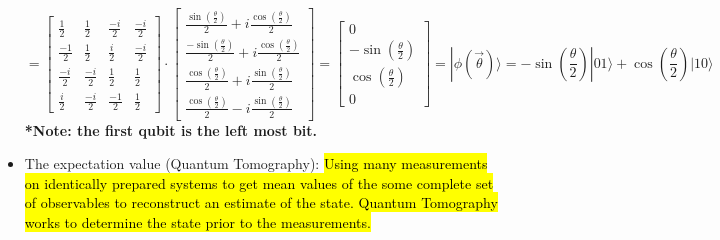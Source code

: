 \documentclass{article}
\begin{document}
\begin{itemize}
	      \begin{equation}
		      \label{eq:1}
		      =
		      \begin{bmatrix}
			      \frac{1}{2}  & \frac{1}{2}  & \frac{-i}{2} & \frac{-i}{2} \\
			      \frac{-1}{2} & \frac{1}{2}  & \frac{i}{2}  & \frac{-i}{2} \\
			      \frac{-i}{2} & \frac{-i}{2} & \frac{1}{2}  & \frac{1}{2}  \\
			      \frac{i}{2}  & \frac{-i}{2} & \frac{-1}{2} & \frac{1}{2}
		      \end{bmatrix}
		      \cdot
		      \begin{bmatrix}
			      \frac{\sin \left(\frac{\theta}{2}\right)}{2} + i \frac{\cos \left(\frac{\theta}{2}\right)}{2}  \\
			      \frac{-\sin \left(\frac{\theta}{2}\right)}{2} + i \frac{\cos \left(\frac{\theta}{2}\right)}{2} \\
			      \frac{\cos \left(\frac{\theta}{2}\right)}{2} + i \frac{\sin \left(\frac{\theta}{2}\right)}{2}  \\
			      \frac{\cos \left(\frac{\theta}{2}\right)}{2} - i \frac{\sin \left(\frac{\theta}{2}\right)}{2}
		      \end{bmatrix}
		      =
		      \begin{bmatrix}
			      0                        \\
			      - \sin(\frac{\theta}{2}) \\
			      \cos(\frac{\theta}{2})   \\
			      0
		      \end{bmatrix}
		      = |\phi(\vec{\theta}) \rangle = -\sin\left(\frac{\theta}{2}\right) |01 \rangle + \cos\left(\frac{\theta}{2}\right) |10 \rangle
	      \end{equation}
	      \textbf{*Note: the first qubit is the left most bit.}

	\item The expectation value (Quantum Tomography):
	      \hl{Using many measurements on identically prepared systems to get mean values of the some complete set of observables to reconstruct an estimate of the state. Quantum Tomography works to
		      determine the state prior to the measurements.}


\end{itemize}
\end{document}
